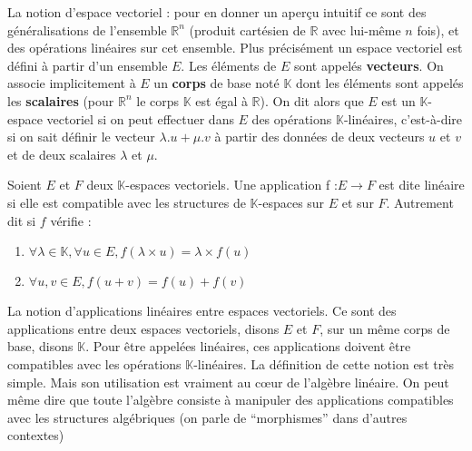 \begin{maremarque}
	La notion d’espace vectoriel : pour en donner un aperçu intuitif ce sont des généralisations de l’ensemble $\mathbb{R}^n$ (produit cartésien de $\mathbb{R}$ avec lui-même $n$ fois), et des opérations linéaires sur cet ensemble. Plus précisément un espace vectoriel est défini à partir d’un ensemble $E$. Les éléments de $E$ sont appelés \textbf{vecteurs}. On associe implicitement à $E$ un \textbf{corps} de base noté $\mathbb{K}$ dont les éléments sont appelés les \textbf{scalaires} (pour $\mathbb{R}^n$ le corps $\mathbb{K}$ est égal à $\mathbb{R}$). On dit alors que $E$ est un $\mathbb{K}$-espace vectoriel si on peut effectuer dans $E$ des opérations $\mathbb{K}$-linéaires, c’est-à-dire si on sait définir le vecteur $\lambda.u+\mu.v$ à partir des données de deux vecteurs $u$ et $v$ et de deux scalaires $\lambda$ et $\mu$.
\end{maremarque}

\begin{madefinition}
	Soient $E$ et $F$ deux $\mathbb{K}$-espaces vectoriels. Une application f :$E \longrightarrow F$ est dite linéaire si elle est compatible avec les structures de $\mathbb{K}$-espaces sur $E$ et sur $F$. Autrement dit si $f$ vérifie : 
	\begin{enumerate}
		\item $\forall \lambda \in \mathbb{K}, \forall u \in E, f(\lambda \times u) = \lambda \times f(u)$
		\item $\forall u,v \in E, f(u+v) = f(u)+f(v)$
	\end{enumerate}
\end{madefinition}

\begin{maremarque}
	La notion d’applications linéaires entre espaces vectoriels. Ce sont des applications entre deux espaces vectoriels, disons $E$ et $F$, sur un même corps de base, disons $\mathbb{K}$. Pour être appelées linéaires, ces applications doivent être compatibles avec les opérations $\mathbb{K}$-linéaires. La définition de cette notion est très simple. Mais son utilisation est vraiment au cœur de l’algèbre linéaire. On peut même dire que toute l’algèbre consiste à manipuler des applications compatibles avec les structures algébriques (on parle de “morphismes” dans d’autres contextes)
\end{maremarque}
